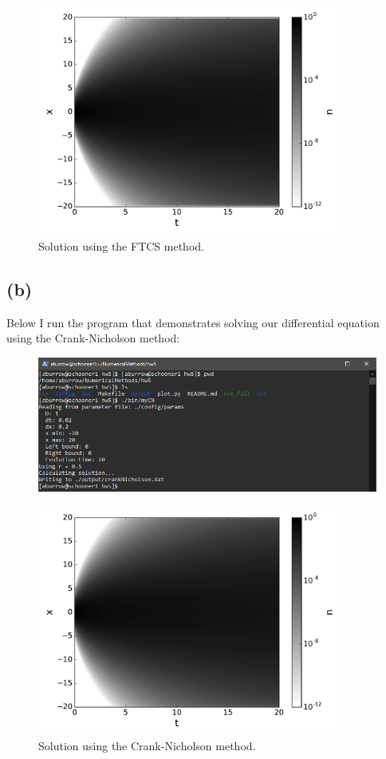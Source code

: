 \documentclass[12pt]{article}
\begin{document}
\begin{figure}[ht]
    \centering
    \includegraphics[width=0.9\textwidth]{ftcs}
    \caption{Solution using the FTCS method.}
    \label{fig:ftcs}
\end{figure}


\subsection*{(b)}

Below I run the program that demonstrates solving our differential equation
using the Crank-Nicholson method:
\begin{figure}[H]
    \centering
    \includegraphics[width=1\textwidth]{myCN}
    \label{fig:myCN}
\end{figure}

\begin{figure}[ht]
    \centering
    \includegraphics[width=0.9\textwidth]{crankNicholson}
    \caption{Solution using the Crank-Nicholson method.}
    \label{fig:crankNicholson}
\end{figure}
\end{document}
